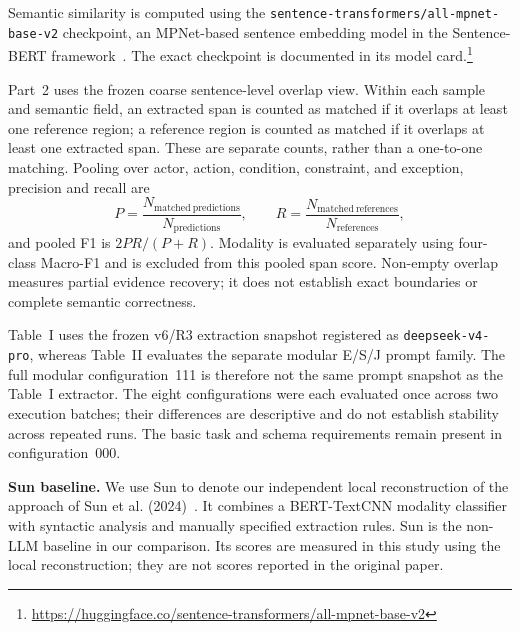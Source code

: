 Semantic similarity is computed using the
\texttt{sentence-transformers/all-mpnet-base-v2} checkpoint, an MPNet-based
sentence embedding model in the Sentence-BERT framework~\cite{reimers2019sentence,song2020mpnet}.
The exact checkpoint is documented in its model card.\footnote{\url{https://huggingface.co/sentence-transformers/all-mpnet-base-v2}}

Part~2 uses the frozen coarse sentence-level overlap view. Within each sample
and semantic field, an extracted span is counted as matched if it overlaps at
least one reference region; a reference region is counted as matched if it
overlaps at least one extracted span. These are separate counts, rather than
a one-to-one matching. Pooling over actor, action, condition, constraint, and
exception, precision and recall are
\begin{equation}
P=\frac{N_{\mathrm{matched\ predictions}}}{N_{\mathrm{predictions}}},\qquad
R=\frac{N_{\mathrm{matched\ references}}}{N_{\mathrm{references}}},
\end{equation}
and pooled F1 is \(2PR/(P+R)\). Modality is evaluated separately using
four-class Macro-F1 and is excluded from this pooled span score.
Non-empty overlap measures partial evidence recovery; it does not establish
exact boundaries or complete semantic correctness.

Table~I uses the frozen v6/R3 extraction snapshot registered as
\texttt{deepseek-v4-pro}, whereas Table~II evaluates the separate modular
E/S/J prompt family. The full modular configuration~111 is therefore not the
same prompt snapshot as the Table~I extractor. The eight configurations were
each evaluated once across two execution batches; their differences are
descriptive and do not establish stability across repeated runs. The basic
task and schema requirements remain present in configuration~000.

\textbf{Sun baseline.} We use Sun to denote our independent local
reconstruction of the approach of Sun et al. (2024)~\cite{sun2024design}.
It combines a BERT-TextCNN modality classifier with syntactic analysis
and manually specified extraction rules. Sun is the non-LLM baseline
in our comparison. Its scores are measured in this study using the
local reconstruction; they are not scores reported in the original paper.

